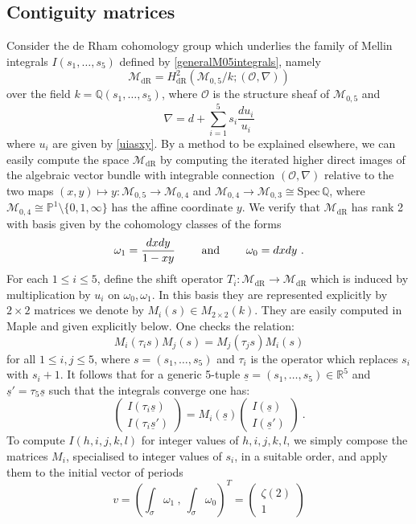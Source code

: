 \documentclass[a4paper,10pt]{amsart}
\theoremstyle{definition}
\theoremstyle{remark}
\numberwithin{equation}{section}
\newcommand{\Q}{\mathbb Q}
\newcommand{\R}{\mathbb R}
\newcommand{\dR}{\mathrm{dR}}
\newcommand{\0}{\color{blue}{\mathsf{0}}}
\begin{document}
\subsection{Contiguity matrices}
Consider the de Rham cohomology group which underlies the family of Mellin integrals $I(s_1,\ldots, s_5)$ defined by \eqref{generalM05integrals},  namely
\[  \mathcal{M}_{\dR}=H_{\dR}^2 (\mathcal{M}_{0,5}/k; (\mathcal{O}, \nabla))\]
over the field $k=\Q(s_1,\ldots, s_5)$, 
where $\mathcal{O}$ is the structure sheaf of  $\mathcal{M}_{0,5}$ and 
\[ \nabla = d+   \sum_{i=1}^5 s_i \frac{d u_i}{u_i}\]
where $u_i$ are given by \eqref{uiasxy}. By a method to be explained elsewhere, we can easily compute the space $\mathcal{M}_{\dR}$  by computing the iterated higher direct images of the algebraic vector bundle with integrable connection $(\mathcal{O}, \nabla)$ relative to the two maps  $(x,y)\mapsto y: \mathcal{M}_{0,5} \rightarrow \mathcal{M}_{0,4} $ and $\mathcal{M}_{0,4} \rightarrow  \mathcal{M}_{0,3}\cong \mathrm{Spec} \, \Q$, where $\mathcal{M}_{0,4}\cong \mathbb{P}^1 \setminus \{0,1,\infty\}$ has the affine  coordinate $y$. We verify that $\mathcal{M}_{\dR}$ has rank 2 with basis given by the cohomology classes of the forms\[  \omega_1= \frac{dx dy}{1-xy} \qquad \hbox{ and } \qquad  \omega_0= dx dy\ . \]
 For each $1\leq i \leq 5$, define the shift operator $T_i : \mathcal{M}_{\dR} \rightarrow \mathcal{M}_{\dR}$ which is  induced by  multiplication by $u_i$ on $\omega_0,\omega_1$. In this basis they are represented explicitly by $2\times 2$ matrices we denote by $M_i (s)\in M_{2\times 2}(k)$.  They are  easily computed in Maple and given explicitly below. One checks the relation:
 \begin{equation}  \label{Mconsistency}  M_i(\tau_i s) M_j(s) = M_j (\tau_j s) M_i(s) 
 \end{equation} 
 for all $1\leq i,j\leq 5$, 
 where $s=(s_1,\ldots, s_5)$ and $\tau_i$ is the operator which replaces $s_i $ with $s_i+1$. 
It follows that  for a  generic 5-tuple $\underline{s} = (s_1,\ldots, s_5)\in \R^5$ and $\underline{s}' = \tau_5 \underline{s}$ such that the integrals converge one has:
\begin{equation} \label{computeIs}   \begin{pmatrix}  I(\tau_i\underline{s}) \\
   I(\tau_i\underline{s}')   
\end{pmatrix}  =
M_i(\underline{s})    \begin{pmatrix}  I( \underline{s}) \\
  I(\underline{s}')  
\end{pmatrix}  \ . 
 \end{equation} 
 To compute $I(h,i,j,k,l)$ for integer values of $h,i,j,k,l$, we simply compose the matrices $M_i$, specialised to integer values of $s_i$,  in a suitable order, and apply them to the initial vector of periods 
\[ v   =   \left(   \int_{\sigma} \omega_1   \ , \     \int_{\sigma} \omega_0 \right)^T =  \begin{pmatrix} \zeta(2) \\    1 \end{pmatrix} \]
\end{document}
